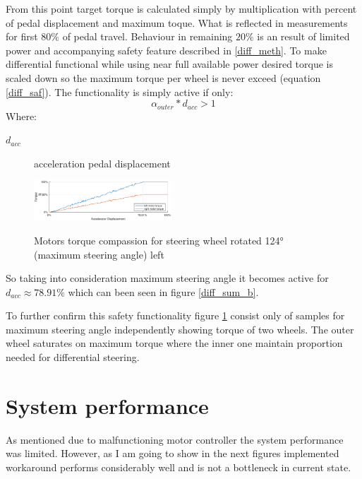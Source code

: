 From this point target torque is calculated simply by multiplication with percent of pedal displacement and maximum toque. What is reflected in measurements for first $80\%$ of pedal travel. 
Behaviour in remaining $20\%$ is an result of limited power and accompanying safety feature described in \ref{diff_meth}. To make differential functional while using near full available power desired torque is scaled down so the maximum torque per wheel is never exceed (equation \ref{diff_saf}).
The functionality is simply active if only: \begin{equation*}
    \alpha_{outer} * d_{acc}>1
\end{equation*} 
Where:
\begin{description}
    \item[$d_{acc}$] acceleration pedal displacement
\end{description}

\begin{figure}
    \vspace{-20pt}
    \begin{center}
        \includegraphics[width=0.46\textwidth]{figures/diff_123}
        \label{diff_123}
        \caption{Motors torque compassion for steering wheel rotated 124° (maximum steering angle) left}
    \end{center}
    \vspace{-20pt}
\end{figure}
So taking into consideration maximum steering angle it becomes active for $d_{acc} \approx 78.91\%$ which can been seen in figure \ref{diff_sum_b}.

To further confirm this safety functionality figure \ref{diff_123} consist only of samples for maximum steering angle independently showing torque of two wheels. The outer wheel saturates on maximum torque where the inner one maintain proportion needed for differential steering.







\section{System performance}
As mentioned due to malfunctioning motor controller the system performance was limited. However, as I am going to show in the next figures implemented workaround performs considerably well and is not a bottleneck in current state.

